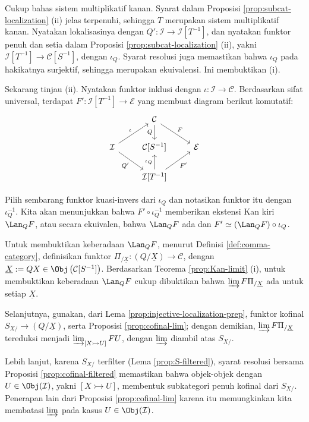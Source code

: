 \begin{bukti}
	Cukup bahas sistem multiplikatif kanan. Syarat dalam Proposisi
	\ref{prop:subcat-localization} (ii) jelas terpenuhi, sehingga $T$ merupakan
	sistem multiplikatif kanan. Nyatakan lokalisasinya dengan
	$Q': \mathcal{I} \to \mathcal{I}[T^{-1}]$, dan nyatakan funktor penuh dan
	setia dalam Proposisi \ref{prop:subcat-localization} (ii), yakni
	$\mathcal{I}[T^{-1}] \to \mathcal{C}[S^{-1}]$, dengan $\iota_Q$. Syarat resolusi juga
	memastikan bahwa $\iota_Q$ pada hakikatnya surjektif, sehingga merupakan
	ekuivalensi. Ini membuktikan (i).

	Sekarang tinjau (ii). Nyatakan funktor inklusi dengan
	$\iota: \mathcal{I} \to \mathcal{C}$. Berdasarkan sifat universal,
	terdapat $F': \mathcal{I}[T^{-1}] \to \mathcal{E}$ yang membuat diagram
	berikut komutatif:
	\[\begin{tikzcd}
		& \mathcal{C} \arrow[d, "Q"'] \arrow[rd, "F"] & \\
		\mathcal{I} \arrow[ru, "\iota"] \arrow[rd, "{Q'}"'] & {\mathcal{C}[S^{-1}]} & \mathcal{E} \\
		& {\mathcal{I}[T^{-1}]} \arrow[u, "\iota_Q"] \arrow[ru, "{F'}"'] &
	\end{tikzcd}\]

	Pilih sembarang funktor kuasi-invers dari $\iota_Q$ dan notasikan funktor
	itu dengan $\iota_Q^{-1}$. Kita
	akan menunjukkan bahwa $F' \circ \iota_Q^{-1}$ memberikan ekstensi Kan
	kiri $\Lan_Q F$, atau secara ekuivalen, bahwa $\Lan_Q F$ ada dan
	$F' \simeq (\Lan_Q F) \circ \iota_Q$.

	Untuk membuktikan keberadaan $\Lan_Q F$, menurut Definisi
	\ref{def:comma-category}, definisikan funktor
	$\Pi_{/\underline{X}}: (Q/\underline{X}) \to \mathcal{C}$, dengan
	$\underline{X} := QX \in
	\Obj\left(\mathcal{C}[S^{-1}]\right)$. Berdasarkan Teorema
	\ref{prop:Kan-limit} (i), untuk membuktikan keberadaan $\Lan_Q F$ cukup
	dibuktikan bahwa $\varinjlim F \Pi_{/\underline{X}}$ ada untuk setiap
	$\underline{X}$.

	Selanjutnya, gunakan, dari Lema
	\ref{prop:injective-localization-prep}, funktor kofinal
	$S_{X/} \to (Q/\underline{X})$, serta Proposisi
	\ref{prop:cofinal-lim}; dengan demikian,
	$\varinjlim F\Pi_{/\underline{X}}$ tereduksi menjadi
	$\varinjlim_{[X \rightarrowtail U]} FU$, dengan $\varinjlim$ diambil atas
	$S_{X/}$.

	Lebih lanjut, karena $S_{X/}$ terfilter (Lema
	\ref{prop:S-filtered}), syarat resolusi bersama Proposisi
	\ref{prop:cofinal-filtered} memastikan bahwa objek-objek dengan
	$U \in \Obj(\mathcal{I})$, yakni $[X \rightarrowtail U]$, membentuk
	subkategori penuh kofinal dari $S_{X/}$. Penerapan lain dari Proposisi
	\ref{prop:cofinal-lim} karena itu memungkinkan kita membatasi
	$\varinjlim$ pada kasus $U \in \Obj(\mathcal{I})$.


\end{bukti}
